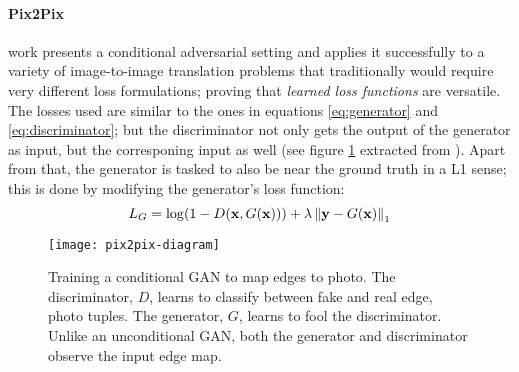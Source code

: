 \documentclass[../main.tex]{subfiles}
\begin{document}
\paragraph{Pix2Pix}
\cite{Isola2016} work presents a conditional adversarial setting and applies it
successfully to a variety of image-to-image translation problems that
traditionally would require very different loss formulations; proving that
\emph{learned loss functions} are versatile.
The losses used are similar to the ones in equations \eqref{eq:generator} and
\eqref{eq:discriminator}; but the discriminator not only gets the output of
the generator as input, but the corresponing input as well
(see figure \ref{fig:pix2pix} extracted from \cite{Isola2016}).
Apart from that, the generator is tasked to also be
near the ground truth in a L1 sense; this is done by modifying the generator's
loss function:
\begin{equation}
L_G = \log(1 - D(\mathbf{x}, G(\mathbf{x}))) +
\lambda \left\| \mathbf{y} - G(\mathbf{x}) \right\|_1
\end{equation}
\begin{figure}[t]
\centering
\texttt{[image: pix2pix-diagram]}
\caption{Training a conditional GAN to map edges to photo.
The discriminator, $D$, learns to classify between fake and real {edge, photo}
tuples. The generator, $G$, learns to fool the discriminator.
Unlike an unconditional GAN, both the generator and discriminator observe the
input edge map.}
\label{fig:pix2pix}
\end{figure}
\end{document}

